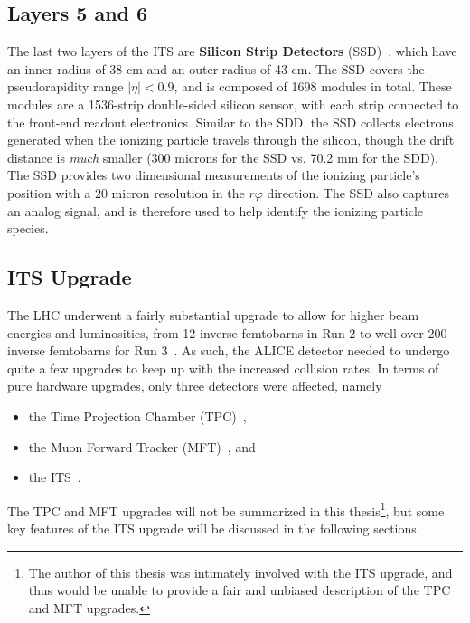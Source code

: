 \subsection{Layers 5 and 6}
The last two layers of the ITS are \textbf{Silicon Strip Detectors} (SSD)~\cite{SSD}, which have an inner radius of 38 cm and an outer radius of 43 cm. The SSD covers the pseudorapidity range $|\eta| < 0.9$, and is composed of 1698 modules in total. These modules are a 1536-strip double-sided silicon sensor, with each strip connected to the front-end readout electronics. Similar to the SDD, the SSD collects electrons generated when the ionizing particle travels through the silicon, though the drift distance is \textit{much} smaller (300 microns for the SSD vs. 70.2 mm for the SDD). The SSD provides two dimensional measurements of the ionizing particle's position with a 20 micron resolution in the $r\varphi$ direction. The SSD also captures an analog signal, and is therefore used to help identify the ionizing particle species.


\subsection{ITS Upgrade}
The LHC underwent a fairly substantial upgrade to allow for higher beam energies and luminosities, from 12 inverse femtobarns in Run 2 to well over 200 inverse femtobarns for Run 3~\cite{LHCUpgrade}. As such, the ALICE detector needed to undergo quite a few upgrades to keep up with the increased collision rates. In terms of pure hardware upgrades, only three detectors were affected, namely
\begin{itemize}
    \item the Time Projection Chamber (TPC)~\cite{TPCUpgrade},
    \item the Muon Forward Tracker (MFT)~\cite{MFTUpgrade}, and
    \item the ITS~\cite{ITSUpgrade}.
\end{itemize}
The TPC and MFT upgrades will not be summarized in this thesis\footnote{The author of this thesis was intimately involved with the ITS upgrade, and thus would be unable to provide a fair and unbiased description of the TPC and MFT upgrades.}, but some key features of the ITS upgrade will be discussed in the following sections.

